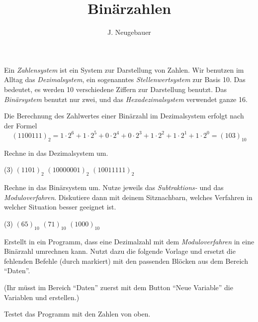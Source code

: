 \documentclass[10pt, a4paper]{scrartcl}
\author{J. Neugebauer}
\title{Binärzahlen}
\date{\Heute}
\begin{document}
\ReiheTitel

Ein \emph{Zahlensystem} ist ein System zur Darstellung von Zahlen. Wir benutzen im Alltag das \emph{Dezimalsystem}, ein sogenanntes \emph{Stellenwertsystem} zur Basis 10. Das bedeutet, es werden 10 verschiedene Ziffern zur Darstellung benutzt. Das \emph{Binärsystem} benutzt nur zwei, und das \emph{Hexadezimalsystem} verwendet ganze 16.

Die Berechnung des Zahlwertes einer Binärzahl im Dezimalsystem erfolgt nach der Formel
\[ (1100111)_2 = 1\cdot 2^6 + 1\cdot 2^5 + 0\cdot 2^4 + 0\cdot 2^3 + 1\cdot 2^2 + 1\cdot 2^1 + 1\cdot 2^0 = (103)_{10} \]

\begin{aufgabe}[symbol=\Large\symHeft]
	Rechne in das Dezimalsystem um.
	\begin{tasks}(3)
		\task $(1101)_2$
		\task $(1000 0001)_2$
		\task $(1001 1111)_2$
	\end{tasks}
\end{aufgabe}

\begin{aufgabe}[symbol=\Large\symHeft\yspace\symPartner]
	Rechne in das Binärsystem um. Nutze jeweils das \emph{Subtraktions-} und das \emph{Moduloverfahren}. Diskutiere dann mit deinem Sitznachbarn, welches Verfahren in welcher Situation besser geeignet ist.
	\begin{tasks}(3)
		\task $(65)_{10}$
		\task $(71)_{10}$
		\task $(1000)_{10}$
	\end{tasks}
\end{aufgabe}

\begin{aufgabe}[symbol=\Large\symLaptop\yspace\symPartner]
	Erstellt in  ein Programm, dass eine Dezimalzahl mit dem \emph{Moduloverfahren} in eine Binärzahl umrechnen kann. Nutzt dazu die folgende Vorlage und ersetzt die fehlenden Befehle (durch  markiert) mit den passenden Blöcken aus dem Bereich \enquote{Daten}.
	
	(Ihr müsst im Bereich \enquote{Daten} zuerst mit dem Button \enquote{Neue Variable} die Variablen  und  erstellen.)
	
	\begin{center}
	\end{center}
	
	Testet das Programm mit den Zahlen von oben.
\end{aufgabe}
\end{document}
